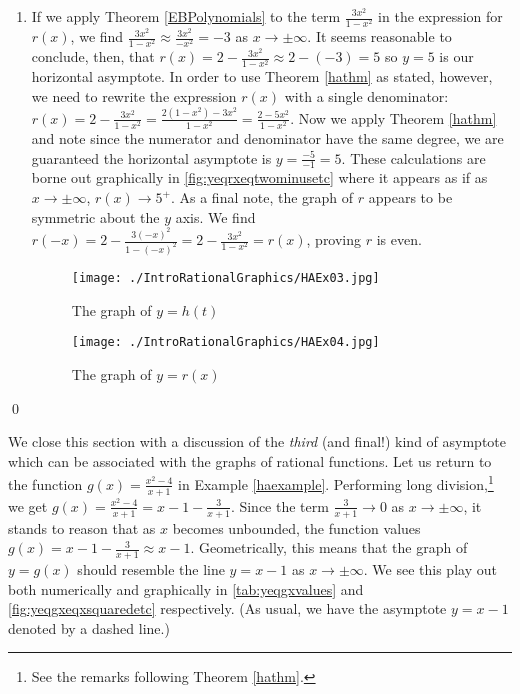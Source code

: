 \begin{ex}
\begin{enumerate}
\item  If we apply Theorem \ref{EBPolynomials} to the term  $\frac{3x^2}{1-x^2}$ in the expression for $r(x)$, we find   $\frac{3x^2}{1-x^2} \approx \frac{3x^2}{-x^2} = -3$ as $x \rightarrow \pm \infty$.  It  seems reasonable to conclude, then, that  $r(x) = 2 - \frac{3x^2}{1-x^2} \approx 2 - (-3) = 5$ so $y = 5$ is our horizontal asymptote.  In order to use Theorem \ref{hathm} as stated, however, we need to rewrite the expression $r(x)$ with a single denominator:  $r(x) = 2 - \frac{3x^2}{1-x^2} = \frac{2(1-x^2) - 3x^2}{1-x^2} = \frac{2-5x^2}{1-x^2}$.  Now we apply Theorem \ref{hathm}  and note since the numerator and denominator have the same degree, we are guaranteed the horizontal asymptote is $y = \frac{-5}{-1} = 5$.  These calculations are borne out graphically in \autoref{fig:yeqrxeqtwominusetc} where it appears as if as $x \rightarrow \pm \infty$, $r(x) \rightarrow 5^{+}$.  As a final note, the graph of $r$ appears to be symmetric about the $y$ axis.  We find $r(-x) = 2 - \frac{3(-x)^2}{1-(-x)^2} = 2 - \frac{3x^2}{1-x^2} = r(x)$, proving $r$ is even.

\begin{figure}
\begin{center}

\texttt{[image: ./IntroRationalGraphics/HAEx03.jpg]}

\caption{The graph of $y=h(t)$}
\label{fig:yeqhteqsixtcubedetc}
\end{center}
\end{figure}

\begin{figure}
\begin{center}
  
\texttt{[image: ./IntroRationalGraphics/HAEx04.jpg]}

\caption{The graph of $y=r(x)$}
\label{fig:yeqrxeqtwominusetc}
\end{center}
\end{figure}

\end{enumerate}

\qed

\end{ex}

We close this section with a discussion of the \textit{third} (and final!) kind of asymptote which can be associated with the graphs of rational functions. Let us return to the function $g(x) = \frac{x^2-4}{x+1}$ in Example \ref{haexample}. Performing long division,\footnote{See the remarks following Theorem \ref{hathm}.} we get $g(x) = \frac{x^2-4}{x+1} = x-1 - \frac{3}{x+1}$.  Since the term $\frac{3}{x+1} \rightarrow 0$ as $x \rightarrow \pm \infty$, it stands to reason that as $x$ becomes unbounded, the function values   $g(x) = x-1 - \frac{3}{x+1} \approx x-1$.  Geometrically, this means that the graph of $y=g(x)$ should resemble the line $y = x-1$ as $x \rightarrow \pm \infty$.  We see this play out both numerically and graphically in \autoref{tab:yeqgxvalues} and \autoref{fig:yeqgxeqxsquaredetc} respectively. (As usual, we have the asymptote $y = x-1$ denoted by a dashed line.)

